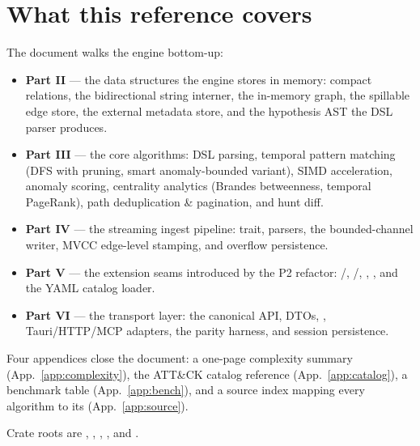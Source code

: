 \section{What this reference covers}

The document walks the engine bottom-up:

\begin{itemize}
    \item \textbf{Part II} --- the data structures the engine stores
        in memory: compact relations, the bidirectional string
        interner, the in-memory graph, the spillable edge store,
        the external metadata store, and the hypothesis AST the DSL
        parser produces.
    \item \textbf{Part III} --- the core algorithms: DSL parsing,
        temporal pattern matching (DFS with pruning, smart
        anomaly-bounded variant), SIMD acceleration, anomaly
        scoring, centrality analytics (Brandes betweenness, temporal
        PageRank), path deduplication \& pagination, and hunt diff.
    \item \textbf{Part IV} --- the streaming ingest pipeline:
         trait, parsers, the bounded-channel writer,
        MVCC edge-level stamping, and overflow persistence.
    \item \textbf{Part V} --- the extension seams introduced by the
        P2 refactor: /,
        /,
        , , and the
        YAML catalog loader.
    \item \textbf{Part VI} --- the transport layer: the canonical
        API, DTOs, , Tauri/HTTP/MCP adapters, the
        parity harness, and session persistence.
\end{itemize}

Four appendices close the document: a one-page complexity summary
(App.~\ref{app:complexity}), the ATT\&CK catalog reference
(App.~\ref{app:catalog}), a benchmark table
(App.~\ref{app:bench}), and a source index mapping every algorithm
to its  (App.~\ref{app:source}).

\begin{inthecode}
Crate roots are ,
,
,
, and
.
\end{inthecode}
